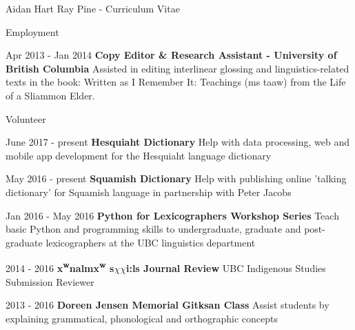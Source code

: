 \documentclass[12pt]{letter}
\begin{document}
\begin{cv}{ Aidan Hart Ray Pine  \space - \space   Curriculum Vitae}
\begin{cvlist}{Employment}
                            \item[Apr 2013 -  Jan 2014 ] \textbf{Copy Editor \& Research Assistant - University of British Columbia}
                \newline Assisted in editing interlinear glossing and linguistics-related texts in the book: Written as I Remember It: Teachings ({\textglotstop}{\textschwa}ms ta{\textglotstop}aw) from the Life of a Sliammon Elder.
                    \end{cvlist}
        
        \begin{cvlist}{Volunteer}
                            \item[June 2017 - present] \textbf{Hesquiaht Dictionary}
                \newline Help with data processing, web and mobile app development for the Hesquiaht language dictionary
                            \item[May 2016 - present] \textbf{Squamish Dictionary}
                \newline Help with publishing online 'talking dictionary' for Squamish language in partnership with Peter Jacobs
                            \item[Jan 2016 - May 2016] \textbf{Python for Lexicographers Workshop Series}
                \newline Teach basic Python and programming skills to undergraduate, graduate and post-graduate lexicographers at the UBC linguistics department
                            \item[2014 - 2016] \textbf{x{\textsuperscript{w}}na{\textglotstop}{\textschwa}l{\textschwa}mx{\textsuperscript{w}} s{\ensuremath{\chi}}{\textschwa}{\ensuremath{\chi}}i:ls Journal Review}
                \newline UBC Indigenous Studies Submission Reviewer
                            \item[2013 - 2016] \textbf{Doreen Jensen Memorial Gitksan Class}
                \newline Assist students by explaining grammatical, phonological and orthographic concepts
                    \end{cvlist}


\end{cv}
\end{document}
